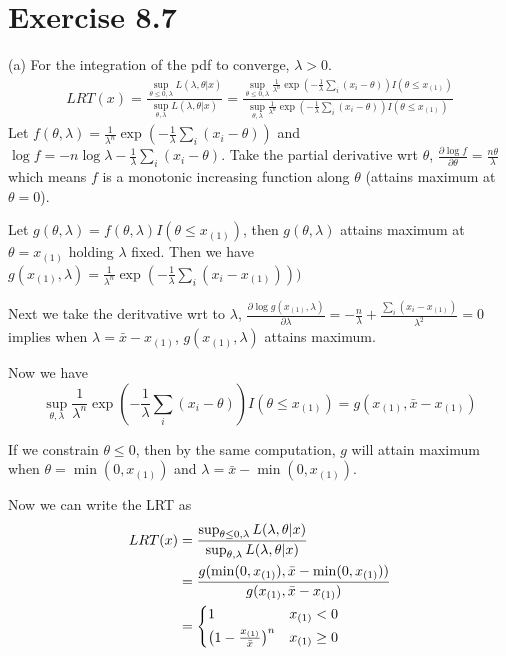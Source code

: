 \documentclass[12pt]{article}
\begin{document}
\section*{Exercise 8.7}
(a)
 For the integration of the pdf to converge, $\lambda > 0$.
 \begin{align*}
	LRT(x) = \frac{\sup_{\theta \leq 0, \lambda} L(\lambda, \theta | x)}{\sup_{\theta, \lambda} L(\lambda, \theta | x)} = \frac{\sup_{\theta \leq 0, \lambda}\frac{1}{\lambda^n} \exp(- \frac{1}{\lambda} \sum_i (x_i - \theta)) I(\theta \leq x_{(1)})}{\sup_{\theta, \lambda}\frac{1}{\lambda^n}  \exp(- \frac{1}{\lambda} \sum_i (x_i - \theta)) I(\theta \leq x_{(1)}) } 
\end{align*}
Let $f(\theta, \lambda) = \frac{1}{\lambda^n} \exp(- \frac{1}{\lambda} \sum_i (x_i - \theta)) $ and $\log f = -n\log \lambda - \frac{1}{\lambda} \sum_i (x_i - \theta)$. Take the partial derivative wrt $\theta$, $\frac{\partial \log f}{\partial \theta} = \frac{n\theta}{\lambda}$ which means $f$ is a monotonic increasing function along $\theta$ (attains maximum at $\theta = 0$). 

Let $g(\theta, \lambda) = f(\theta, \lambda) I(\theta \leq x_{(1)})$, then $g(\theta, \lambda)$ attains maximum at $\theta = x_{(1)}$ holding $\lambda$ fixed.  Then we have $g(x_{(1)}, \lambda) = \frac{1}{\lambda^n} \exp(- \frac{1}{\lambda} \sum_i (x_i - x_{(1)})))$

Next we take the deritvative wrt to $\lambda$,  $\frac{\partial \log g(x_{(1)}, \lambda)}{\partial \lambda} = -\frac{n}{\lambda} + \frac{\sum_i (x_i -  x_{(1)})}{\lambda^2} = 0$ implies when $\lambda = \bar{x} - x_{(1)}$, $g(x_{(1)}, \lambda)$ attains maximum. 

Now we have
$$\sup_{\theta, \lambda}\frac{1}{\lambda^n}  \exp(- \frac{1}{\lambda} \sum_i (x_i - \theta)) I(\theta \leq x_{(1)}) = g(x_{(1)}, \bar{x} - x_{(1)})$$

If we constrain $\theta \leq 0$,  then by the same computation, $g$ will attain maximum when $\theta = \min(0, x_{(1)})$ and $\lambda = \bar{x} - \min(0, x_{(1)})$.

Now we can write the LRT as 
\begin{align*}
	LRT(x) &=  \frac{\sup_{\theta \leq 0, \lambda} L(\lambda, \theta | x)}{\sup_{\theta, \lambda} L(\lambda, \theta | x)} \\
	&=  \frac{g(\min(0, x_{(1)}), \bar{x} - \min(0, x_{(1)}))}{g(x_{(1)}, \bar{x} - x_{(1)})} \\
	&= \begin{cases*}
		1 &  $x_{(1)} < 0$ \\
		\left(1 - \frac{x_{(1)}}{\bar{x}} \right)^n & $x_{(1)} \geq 0 $
	\end{cases*}
\end{align*}
\end{document}
